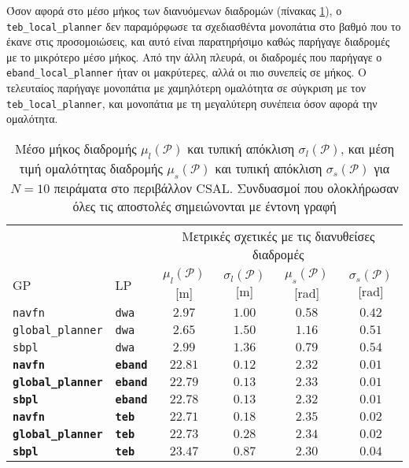 Όσον αφορά στο μέσο μήκος των διανυόμενων διαδρομών
(πίνακας \ref{tbl:info_ground_truth_csal}), ο \texttt{teb\_local\_planner} δεν
παραμόρφωσε τα σχεδιασθέντα μονοπάτια στο βαθμό που το έκανε στις
προσομοιώσεις, και αυτό είναι παρατηρήσιμο καθώς παρήγαγε διαδρομές με το
μικρότερο μέσο μήκος. Από την άλλη πλευρά, οι διαδρομές που παρήγαγε ο
\texttt{eband\_local\_planner} ήταν οι μακρύτερες, αλλά οι πιο συνεπείς σε μήκος.
Ο τελευταίος παρήγαγε μονοπάτια με χαμηλότερη ομαλότητα σε σύγκριση με τον
\texttt{teb\_local\_planner}, και μονοπάτια με τη μεγαλύτερη συνέπεια όσον αφορά
την ομαλότητα.

\begin{table}[h]\centering
\renewcommand{\arraystretch}{1.3}
\begin{tabular}{llcccc}
& & \multicolumn{4}{c}{Μετρικές σχετικές με τις διανυθείσες διαδρομές} \\
\cline{3-6}
  GP & LP & $\mu_{l}(\bm{\mathcal{P}})$ [m] & $\sigma_{l}(\bm{\mathcal{P}})$ [m] & $\mu_{s}(\bm{\mathcal{P}})$ [rad] & $\sigma_{s}(\bm{\mathcal{P}})$ [rad] \\ \toprule
  \texttt{navfn} & \texttt{dwa} & $2.97$ & $1.00$ & $0.58$ & $0.42$ \\
  \texttt{global\_planner} & \texttt{dwa} & $2.65$ & $1.50$ & $1.16$ & $0.51$ \\
  \texttt{sbpl} & \texttt{dwa} & $2.99$ & $1.36$ & $0.79$ & $0.54$ \\
  \textbf{\texttt{navfn}} & \textbf{\texttt{eband}} & $\bm{22.81}$ & $\bm{0.12}$ & $\bm{2.32}$ & $\bm{0.01}$ \\
  \textbf{\texttt{global\_planner}} & \textbf{\texttt{eband}} & $\bm{22.79}$ & $\bm{0.13}$ & $\bm{2.33}$ & $\bm{0.01}$ \\
  \textbf{\texttt{sbpl}} & \textbf{\texttt{eband}} & $\bm{22.78}$ & $\bm{0.13}$ & $\bm{2.32}$ & $\bm{0.01}$ \\
  \textbf{\texttt{navfn}} & \textbf{\texttt{teb}} & $\bm{22.71}$ & $\bm{0.18}$ & $\bm{2.35}$ & $\bm{0.02}$ \\
  \textbf{\texttt{global\_planner}} & \textbf{\texttt{teb}} & $\bm{22.73}$ & $\bm{0.28}$ & $\bm{2.34}$ & $\bm{0.02}$ \\
  \textbf{\texttt{sbpl}} & \textbf{\texttt{teb}} & $\bm{23.47}$ & $\bm{0.87}$ & $\bm{2.30}$ & $\bm{0.04}$ \\ \bottomrule
\end{tabular}
\caption{\small Μέσο μήκος διαδρομής $\mu_{l}(\bm{\mathcal{P}})$ και τυπική
         απόκλιση $\sigma_{l}(\bm{\mathcal{P}})$, και μέση τιμή ομαλότητας
         διαδρομής $\mu_{s}(\bm{\mathcal{P}})$ και τυπική απόκλιση
         $\sigma_{s}(\bm{\mathcal{P}})$ για $N=10$ πειράματα στο περιβάλλον
         CSAL. Συνδυασμοί που ολοκλήρωσαν όλες τις αποστολές  σημειώνονται
         με έντονη γραφή}
\label{tbl:info_ground_truth_csal}
\end{table}

